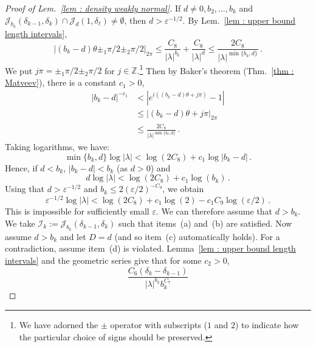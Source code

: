 \documentclass[a4paper,UKenglish,cleveref, autoref, thm-restate]{lipics-v2021}
\begin{document}
\begin{proof}[Proof of Lem.~\ref{lem : density weakly normal}]
    If  $d \ne 0, b_2,\dots, b_k$ and $\mathcal{J}_{b_k}(\delta_{k-1}, \delta_k) \cap \mathcal{J}_d(1, \delta_\ell) \ne \emptyset$, then $d > \varepsilon^{-1/2}$.
    By Lem.~\ref{lem : upper bound length intervals}, 
    \begin{equation*}
        |(b_k - d)\theta \pm_1 \pi/2 \pm_2 \pi/2|_{2\pi} \le
        \frac{C_8}{|\lambda|^{b_k}} + \frac{C_8}{|\lambda|^d}\le
        \frac{2C_8}{|\lambda|^{\min\{b_k, d\}}} \, .
    \end{equation*}
    We put $j \pi = \pm_1 \pi/2 \pm_2 \pi /2$ for $j \in
    \mathbb{Z}$.\footnote{We have adorned the $\pm$ operator with
      subscripts ($1$ and $2$) to indicate how the particular choice of
      signs should be preserved.}
    Then by Baker's theorem (Thm.~\ref{thm : Matveev}), there is a constant $c_1 > 0$,
    \begin{align*}
        |b_k-d|^{-c_1} 
        &< |e^{i( (b_k-d)\theta+j \pi)} - 1| \\
        &\le |(b_k - d)\theta+j \pi|_{2\pi} \\
        &\le \frac{2C_8}{|\lambda|^{\min\{b_k, d\}}} \, .
    \end{align*}
    Taking logarithms, we have:
    \begin{equation}\label{eq : random eq in weak normality lemma}
         \min\{b_k, d\} \log|\lambda| < \log(2C_8) + c_1\log|b_k-d| \,
         .
    \end{equation}
    Hence, if $d < b_k$, $|b_k-d| < b_k$ (as $d > 0$) and
    \begin{equation*}
        d \log|\lambda| < \log(2C_8) + c_1 \log(b_k) \, .
    \end{equation*}
    Using that $d > \varepsilon^{-1/2}$ and $b_k \le 2(\varepsilon/2)^{-C_9}$, we obtain
    \begin{equation*}
         \varepsilon^{-1/2} \log|\lambda| < \log(2C_8) + c_1\log(2)
         - c_1 C_9 \log(\varepsilon/2) \, .
    \end{equation*}
    This is impossible for sufficiently small $\varepsilon$.
    We can therefore assume that $d > b_k$.
    We take $\mathcal{I}_k := \mathcal{J}_{b_k}(\delta_{k-1},\delta_k)$ such that items~(a) and~(b) are satisfied. 
    Now assume $d > b_k$ and let $D = d$ (and so item~(c) automatically holds).
    For a contradiction, assume item~(d) is violated.
    Lemma~\ref{lem : upper bound length intervals} and the geometric series give that for some $c_2 >0$,
    \begin{equation*}
         \frac{C_6(\delta_k - \delta_{k-1})}{|\lambda|^{b_k}b_k^{C_7}}

\end{equation*}
\end{proof}
\end{document}
